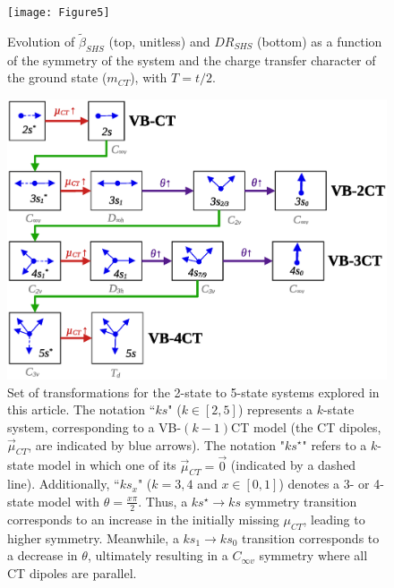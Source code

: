 \documentclass[USenglish]{article}
\begin{document}
\begin{figure}[!h]
	\texttt{[image: Figure5]}
	\caption{Evolution of $\tilde \beta_{SHS}$ (top, unitless) and $DR_{SHS}$ (bottom) as a function of the symmetry of the system and the charge transfer character of the ground state ($m_{CT}$), with $T=t/2$.}
	\label{fig:beta}
\end{figure}

\begin{figure}
	\includegraphics[width=.8\linewidth]{Figure6}
	\caption{Set of transformations for the 2-state to 5-state systems explored in this article. The notation ``$ks$" ($k \in [2,5]$) represents a $k$-state system, corresponding to a VB-$(k-1)$CT model (the CT dipoles, $\vec\mu_{CT}$, are indicated by blue arrows). The notation "$ks^\star$" refers to a $k$-state model in which one of its $\vec\mu_{CT} = \vec 0$ (indicated by a dashed line).  Additionally, ``$ks_x$" ($k=3,4$ and $x \in [0,1]$) denotes a 3- or 4-state model with $\theta = \frac{x\pi}{2}$. Thus, a $ks^\star \to ks$ symmetry transition corresponds to an increase in the initially missing $\mu_{CT}$, leading to higher symmetry. Meanwhile, a $ks_1 \to ks_0$ transition corresponds to a decrease in $\theta$, ultimately resulting in a $C_{\infty v}$ symmetry where all CT dipoles are parallel.}
	\label{sc:symmetry}
\end{figure}
\end{document}
